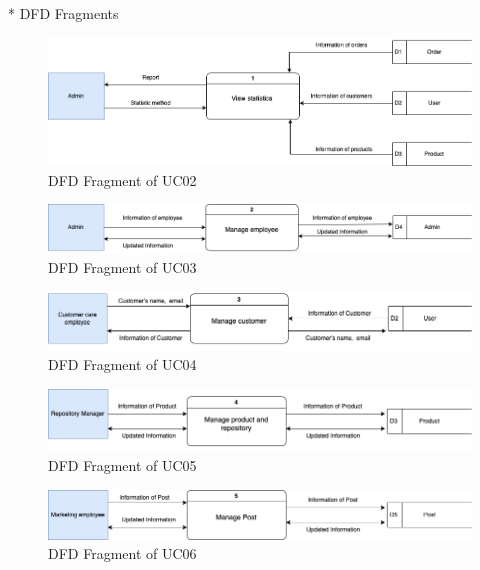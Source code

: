 * DFD Fragments
\begin{figure}[H]
  \centering
  \includegraphics[width=1.1\textwidth]{DFD-UC02.png}
  \caption{DFD Fragment of UC02}
  \label{fig:dfd-uc02}
\end{figure}

\begin{figure}[H]
  \centering
  \includegraphics[width=1.1\textwidth]{DFD-UC03.png}
  \caption{DFD Fragment of UC03}
  \label{fig:dfd-uc03}
\end{figure}

\begin{figure}[H]
  \centering
  \includegraphics[width=1.1\textwidth]{DFD-UC04.png}
  \caption{DFD Fragment of UC04}
  \label{fig:dfd-uc04}
\end{figure}

\begin{figure}[H]
  \centering
  \includegraphics[width=1.1\textwidth]{DFD-UC05.png}
  \caption{DFD Fragment of UC05}
  \label{fig:dfd-uc05}
\end{figure}

\begin{figure}[H]
  \centering
  \includegraphics[width=1.1\textwidth]{DFD-UC06.png}
  \caption{DFD Fragment of UC06}
  \label{fig:dfd-uc06}
\end{figure}

